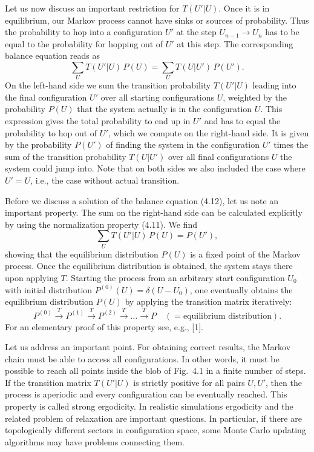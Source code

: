 Let us now discuss an important restriction for $T(U'|U)$. Once it is in
equilibrium, our Markov process cannot have sinks or sources of probability.
Thus the probability to hop into a configuration $U'$ at the step $U_{n-1} \to U_n$
has to be equal to the probability for hopping out of $U'$ at this step. The
corresponding balance equation reads as
\begin{equation}
  \sum_{U} T(U'|U)\,P(U) = \sum_{U} T(U|U')\,P(U').
\end{equation}
On the left-hand side we sum the transition probability $T(U'|U)$ leading into
the final configuration $U'$ over all starting configurations $U$, weighted by the
probability $P(U)$ that the system actually is in the configuration $U$. This
expression gives the total probability to end up in $U'$ and has to equal the
probability to hop out of $U'$, which we compute on the right-hand side. It is
given by the probability $P(U')$ of finding the system in the configuration $U'$
times the sum of the transition probability $T(U|U')$ over all final configurations $U$ the system could jump into. Note that on both sides we also included
the case where $U' = U$, i.e., the case without actual transition.

Before we discuss a solution of the balance equation (4.12), let us note
an important property. The sum on the right-hand side can be calculated
explicitly by using the normalization property (4.11). We find
\begin{equation}
  \sum_{U} T(U'|U)\,P(U) = P(U'),
\end{equation}
showing that the equilibrium distribution $P(U)$ is a fixed point of the Markov
process. Once the equilibrium distribution is obtained, the system stays there
upon applying $T$. Starting the process from an arbitrary start configuration
$U_0$ with initial distribution $P^{(0)}(U) = \delta(U - U_0)$, one eventually obtains the
equilibrium distribution $P(U)$ by applying the transition matrix iteratively:
\begin{equation}
  P^{(0)} \xrightarrow{T} P^{(1)} \xrightarrow{T} P^{(2)} \xrightarrow{T} \ldots \xrightarrow{T} P
  \quad (= \text{equilibrium distribution}).
\end{equation}
For an elementary proof of this property see, e.g., [1].

Let us address an important point. For obtaining correct results, the
Markov chain must be able to access all configurations. In other words, it
must be possible to reach all points inside the blob of Fig.~4.1 in a finite number of steps. If the transition matrix $T(U'|U)$ is strictly positive for all pairs
$U, U'$, then the process is aperiodic and every configuration can be eventually reached. This property is called strong ergodicity. In realistic simulations
ergodicity and the related problem of relaxation are important questions. In
particular, if there are topologically different sectors in configuration space,
some Monte Carlo updating algorithms may have problems connecting them.

